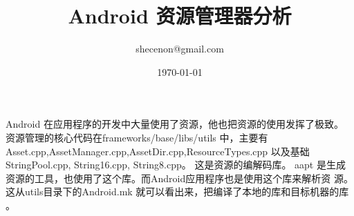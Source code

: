 \documentclass[a4paper,11pt]{article}
\title{Android 资源管理器分析}
\author{shecenon@gmail.com}
\date{\today}
\begin{document}
\maketitle
\renewcommand{\refname}{参考文献}
\renewcommand\contentsname{目录}
\renewcommand\listfigurename{插图目录}
\renewcommand\listtablename{表格目录}
\renewcommand\indexname{索引}
\renewcommand\appendixname{附录}
\renewcommand\figurename{图}
\renewcommand\tablename{表}
\renewcommand{\lstlistlistingname}{代码列表集}
\renewcommand{\lstlistingname}{代码}

\def\equationautorefname{公式}%
\def\figureautorefname{图}%
\def\subfigureautorefname{子图}%
\def\sectionautorefname{节}%
\def\subsectionautorefname{子节}%
\def\subsubsectionautorefname{小节}%
\def\Itemautorefname{项}%
\def\tableautorefname{表格}%
\def\footnoteautorefname{脚注} 
\def\appendixautorefname{附录}


\setlength{\columnsep}{.8cm}
\setlength{\parskip}{1ex}
\tableofcontents
\makeatletter
\newcommand{\figcaption}{\def\@captype{figure}\caption}
\newcommand{\tabcaption}{\def\@captype{table}\caption}
\makeatother

\def\call#1{\\* {\indent #1 \\*\noindent}} 
\newcommand{\various}[1]{{\color{cyan}\textit{#1}}}
\def\binder{{\color{red}binder }}
\def\cref#1{$^{\scriptsize\ref{#1}}$}

\setlength{\leftmargin}{1.2em}     %
\setlength{\parsep}{0ex}         %
\setlength{\topsep}{1ex}         %
\setlength{\itemsep}{0.5ex}        %
\setlength{\labelsep}{0.3em}     %
\setlength{\itemindent}{1.1em}    %
\setlength{\listparindent}{0em} %

Android 在应用程序的开发中大量使用了资源，他也把资源的使用发挥了极致。
资源管理的核心代码在frameworks/base/libs/utils 中，主要有 
Asset.cpp,AssetManager.cpp,AssetDir.cpp,ResourceTypes.cpp
以及基础StringPool.cpp, String16.cpp, String8.cpp。
这是资源的编解码库。
aapt 是生成资源的工具，也使用了这个库。而Android应用程序也是使用这个库来解析资
源。 这从utils目录下的Android.mk 就可以看出来，把编译了本地的库和目标机器的库
。
\end{document}
